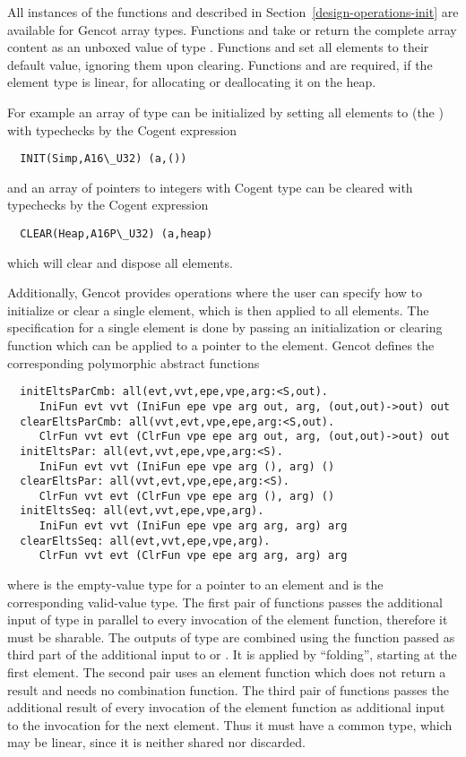 All instances of the functions  and  described in 
Section~\ref{design-operations-init} are available
for Gencot array types. Functions  and  take or return the complete array content
as an unboxed value of type . Functions  and  set all elements
to their default value, ignoring them upon clearing. Functions  and  
are required, if the element type is linear, for allocating or deallocating it on the heap.

For example an array  of type  can be initialized by setting all elements to  
(the ) with typechecks by the Cogent expression
\begin{verbatim}
  INIT(Simp,A16\_U32) (a,())
\end{verbatim}
and an array  of pointers to integers with Cogent type  can be cleared with typechecks by the Cogent expression
\begin{verbatim}
  CLEAR(Heap,A16P\_U32) (a,heap)
\end{verbatim}
which will clear and dispose all elements.

Additionally, Gencot provides operations where the user can specify how to initialize or clear a single element, which is then
applied to all elements. The specification for a single element is done by passing an initialization or clearing function which
can be applied to a pointer to the element. Gencot defines the corresponding polymorphic abstract functions
\begin{verbatim}
  initEltsParCmb: all(evt,vvt,epe,vpe,arg:<S,out). 
     IniFun evt vvt (IniFun epe vpe arg out, arg, (out,out)->out) out
  clearEltsParCmb: all(vvt,evt,vpe,epe,arg:<S,out). 
     ClrFun vvt evt (ClrFun vpe epe arg out, arg, (out,out)->out) out
  initEltsPar: all(evt,vvt,epe,vpe,arg:<S). 
     IniFun evt vvt (IniFun epe vpe arg (), arg) ()
  clearEltsPar: all(vvt,evt,vpe,epe,arg:<S). 
     ClrFun vvt evt (ClrFun vpe epe arg (), arg) ()
  initEltsSeq: all(evt,vvt,epe,vpe,arg). 
     IniFun evt vvt (IniFun epe vpe arg arg, arg) arg
  clearEltsSeq: all(evt,vvt,epe,vpe,arg). 
     ClrFun vvt evt (ClrFun vpe epe arg arg, arg) arg
\end{verbatim}
where  is the empty-value type for a pointer to an element and  is the corresponding valid-value type.
The first pair of functions passes the additional input of type  in parallel to every invocation of the element function, 
therefore it must be sharable. The outputs of type  are combined using the function passed as third part of
the additional input to  or . It is applied by ``folding'', starting at the first element.
The second pair uses an element function which does not return a result and needs no combination function.
The third pair of functions passes the additional result of every invocation of the element function as additional input 
to the invocation for the next element. Thus it must have a common type, which may be linear, since it is neither shared nor
discarded. 

